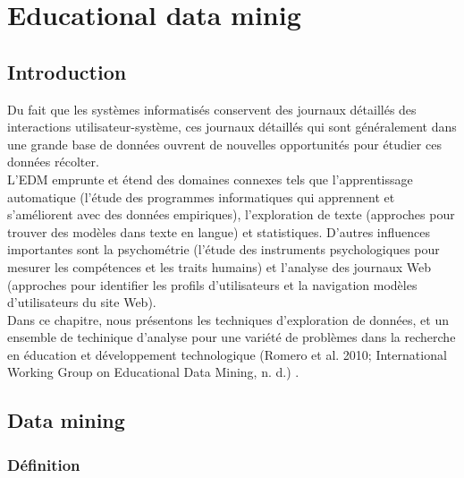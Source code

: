 \chapter{Educational data minig}\label{chap1}
\minitoc
\thispagestyle{empty}
\newpage	
	
    \section{Introduction}
    
    Du fait que les systèmes informatisés conservent des journaux détaillés des interactions utilisateur-système, ces journaux 
    détaillés qui sont généralement dans une grande base de données ouvrent de nouvelles opportunités pour étudier ces données récolter.\\
    
    L'EDM emprunte et étend des domaines connexes tels que l'apprentissage automatique (l'étude des programmes informatiques 
    qui apprennent et s'améliorent avec des données empiriques), l’exploration de texte (approches pour trouver des modèles 
    dans texte en langue) et statistiques. D'autres influences importantes sont la psychométrie (l'étude des instruments 
    psychologiques pour mesurer les compétences et les traits humains) et l'analyse des journaux Web (approches pour identifier 
    les profils d'utilisateurs et la navigation modèles d'utilisateurs du site Web). \\
    Dans ce chapitre, nous présentons les techniques d'exploration de données, et un ensemble de techinique d'analyse pour 
    une variété de problèmes dans la recherche en éducation et développement technologique (Romero et al. 2010; International
    Working Group on Educational Data Mining, n. d.) \cite{Scheuer2012}. \\

    \section{Data mining}

    \subsection{Définition}

